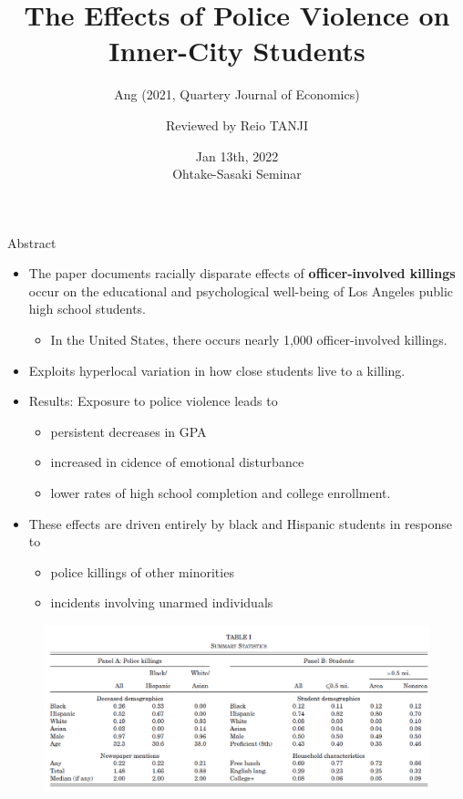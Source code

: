 \documentclass[dvipdfmx,11pt]{beamer}
\title[Ang (2021, QJE)]{The Effects of Police Violence on Inner-City Students}
\subtitle{Ang (2021, Quartery Journal of Economics)}
\author[Reviewed by R.TANJI]{Reviewed by Reio TANJI}
\date{Jan 13th, 2022 \\ Ohtake-Sasaki Seminar}
\institute[]{Osaka University, Graduate School of Economics}
\begin{document}
\begin{frame}\frametitle{}
\titlepage
\end{frame}

\begin{frame}{Abstract}
  \begin{itemize}
    \item The paper documents racially disparate effects of \textbf{officer-involved killings} occur on the educational and psychological well-being of Los Angeles public high school students.
    \begin{itemize}
      \item In the United States, there occurs nearly 1,000 officer-involved killings.
    \end{itemize}
    \item Exploits hyperlocal variation in how close students live to a killing.
    \item Results: Exposure to police violence leads to
    \begin{itemize}
      \item persistent decreases in GPA
      \item increased in cidence of emotional disturbance
      \item lower rates of high school completion and college enrollment.
    \end{itemize}
    \item These effects are driven entirely by black and Hispanic students in response to
    \begin{itemize}
      \item police killings of other minorities
      \item incidents involving unarmed individuals
    \end{itemize}
  \end{itemize}
\end{frame}

\begin{frame}{}
  \begin{figure}
    \centering
    \includegraphics[scale = .6]{fig_tab/os20220113/T1}
  \end{figure}
\end{frame}
\end{document}
